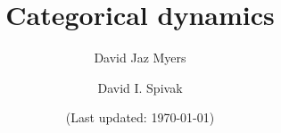 \documentclass[11pt, book]{memoir}
\newcommand{\titlefont}{\normalfont\Huge\bfseries}
\theoremstyle{plain}
\theoremstyle{plain}
\theoremstyle{remark}
\newcommand{\0}{\textsf{0}}
\newcommand{\1}{\textsf{1}}
\newcommand{\2}{\textsf{2}}
\newcommand{\3}{\textsf{3}}
\newcommand{\4}{\textsf{4}}
\newcommand{\5}{\textsf{5}}
\newcommand{\6}{\textsf{6}}
\newcommand{\7}{\textsf{7}}
\newcommand{\8}{\textsf{8}}
\newcommand{\9}{\textsf{9}}
\begin{document}
\frontmatter

\title{\titlefont Categorical dynamics}

\author{\LARGE David Jaz Myers \and \LARGE David I. Spivak}



\date{\vfill (Last updated: \today)}

\maketitle
\thispagestyle{empty}



\clearpage
\tableofcontents*

\mainmatter














\appendix
\begingroup
\footnotesize



\backmatter
%

\printbibliography
\printindex
\end{document}
